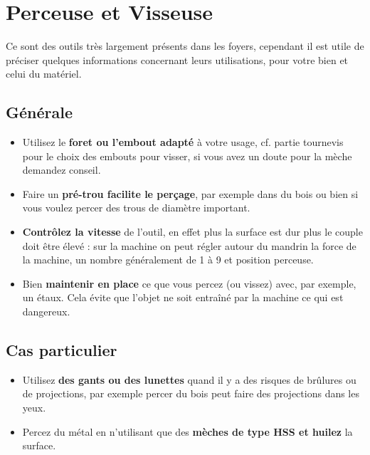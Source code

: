 \section*{Perceuse et Visseuse}
Ce sont des outils très largement présents dans les foyers, cependant il est utile de préciser quelques informations concernant leurs utilisations, pour votre bien et celui du matériel.

\subsection*{Générale}
\begin{itemize}
\item Utilisez le \textbf{foret ou l'embout adapté} à votre usage, cf. partie tournevis pour le choix des embouts pour visser, si vous avez un doute pour la mèche demandez conseil.

\item Faire un \textbf{pré-trou facilite le perçage}, par exemple dans du bois ou bien si vous voulez percer des trous de diamètre important.

\item \textbf{Contrôlez la vitesse} de l'outil, en effet plus la surface est dur plus le couple doit être élevé : sur la machine on peut régler autour du mandrin la force de la machine, un nombre généralement de 1 à 9 et position perceuse.

\item Bien \textbf{maintenir en place} ce que vous percez (ou vissez) avec, par exemple, un étaux. Cela évite que l'objet ne soit entraîné par la machine ce qui est dangereux.
\end{itemize}

\subsection*{Cas particulier}
\begin{itemize}
\item Utilisez \textbf{des gants ou des lunettes} quand il y a des risques de brûlures ou de projections, par exemple percer du bois peut faire des projections dans les yeux.

\item Percez du métal en n'utilisant que des \textbf{mèches de type HSS et huilez} la surface.
\end{itemize}
